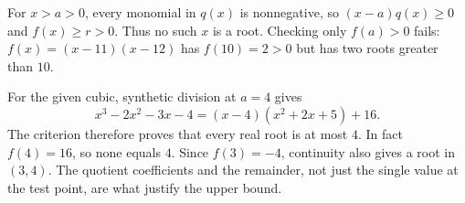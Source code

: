 For $x>a>0$, every monomial in $q(x)$ is nonnegative, so $(x-a)q(x)\ge0$ and $f(x)\ge r>0$. Thus no such $x$ is a root.
Checking only $f(a)>0$ fails: $f(x)=(x-11)(x-12)$ has $f(10)=2>0$ but has two roots greater than $10$.

For the given cubic, synthetic division at $a=4$ gives
\[
x^3-2x^2-3x-4=(x-4)(x^2+2x+5)+16.
\]
The criterion therefore proves that every real root is at most $4$. In fact $f(4)=16$, so none equals $4$. Since $f(3)=-4$, continuity also gives a root in $(3,4)$. The quotient coefficients and the remainder, not just the single value at the test point, are what justify the upper bound.
